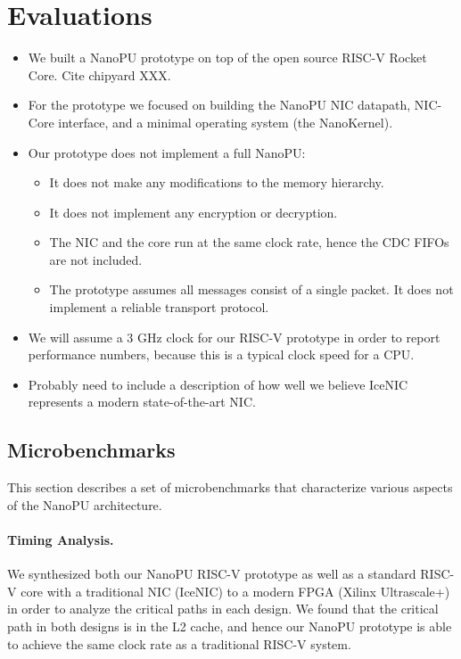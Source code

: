 \section{Evaluations}
\begin{itemize}
    \item We built a NanoPU prototype on top of the open source RISC-V Rocket Core. Cite chipyard XXX.
    \item For the prototype we focused on building the NanoPU NIC datapath, NIC-Core interface, and a minimal operating system (the NanoKernel).
    \item Our prototype does not implement a full NanoPU:
    \begin{itemize}
        \item It does not make any modifications to the memory hierarchy.
        \item It does not implement any encryption or decryption.
        \item The NIC and the core run at the same clock rate, hence the CDC FIFOs are not included.
        \item The prototype assumes all messages consist of a single packet. It does not implement a reliable transport protocol.
    \end{itemize}
    \item We will assume a 3 GHz clock for our RISC-V prototype in order to report performance numbers, because this is a typical clock speed for a CPU. 
    \item Probably need to include a description of how well we believe IceNIC represents a modern state-of-the-art NIC.
\end{itemize}

\subsection{Microbenchmarks}
This section describes a set of microbenchmarks that characterize various aspects of the NanoPU architecture.

\paragraph{Timing Analysis.} We synthesized both our NanoPU RISC-V prototype as well as a standard RISC-V core with a traditional NIC (IceNIC) to a modern FPGA (Xilinx Ultrascale+) in order to analyze the critical paths in each design. We found that the critical path in both designs is in the L2 cache, and hence our NanoPU prototype is able to achieve the same clock rate as a traditional RISC-V system.

